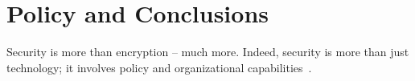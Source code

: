 \section{Policy and Conclusions}



Security is more than encryption -- much more.  Indeed, security is
more than just technology; it involves policy and organizational
capabilities~\cite{clarke2019fifth}.
